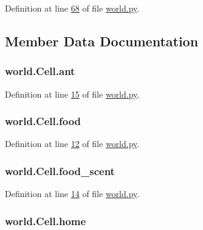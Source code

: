 Definition at line \hyperlink{world_8py_source_l00068}{68} of file \hyperlink{world_8py_source}{world.\+py}.



\subsection{Member Data Documentation}
\hypertarget{classworld_1_1Cell_abfd9b278ac86f77970b7766a7c2e3231}{
\subsubsection[{ant}]{\setlength{\rightskip}{0pt plus 5cm}world.\+Cell.\+ant}}\label{classworld_1_1Cell_abfd9b278ac86f77970b7766a7c2e3231}


Definition at line \hyperlink{world_8py_source_l00015}{15} of file \hyperlink{world_8py_source}{world.\+py}.

\hypertarget{classworld_1_1Cell_a401fde7236825c1843dad8764c2fb4a8}{
\subsubsection[{food}]{\setlength{\rightskip}{0pt plus 5cm}world.\+Cell.\+food}}\label{classworld_1_1Cell_a401fde7236825c1843dad8764c2fb4a8}


Definition at line \hyperlink{world_8py_source_l00012}{12} of file \hyperlink{world_8py_source}{world.\+py}.

\hypertarget{classworld_1_1Cell_acec0cb9d8a7eb92bedf71dc57641efbe}{
\subsubsection[{food\+\_\+scent}]{\setlength{\rightskip}{0pt plus 5cm}world.\+Cell.\+food\+\_\+scent}}\label{classworld_1_1Cell_acec0cb9d8a7eb92bedf71dc57641efbe}


Definition at line \hyperlink{world_8py_source_l00014}{14} of file \hyperlink{world_8py_source}{world.\+py}.

\hypertarget{classworld_1_1Cell_a9baf3378be8090bf1faf1b19b9aa5fd3}{
\subsubsection[{home}]{\setlength{\rightskip}{0pt plus 5cm}world.\+Cell.\+home}}\label{classworld_1_1Cell_a9baf3378be8090bf1faf1b19b9aa5fd3}


